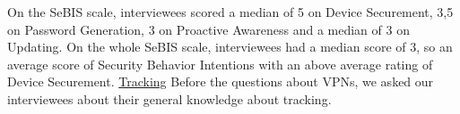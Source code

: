 On the SeBIS scale, interviewees scored a median of 5 on Device Securement, 3,5 on Password Generation, 3 on Proactive Awareness and a median of 3 on Updating. On the whole SeBIS scale, interviewees had a median score of 3, so an average score of Security Behavior Intentions with an above average rating of Device Securement.
\underline{Tracking}
Before the questions about VPNs, we asked our interviewees about their general knowledge about tracking. 


